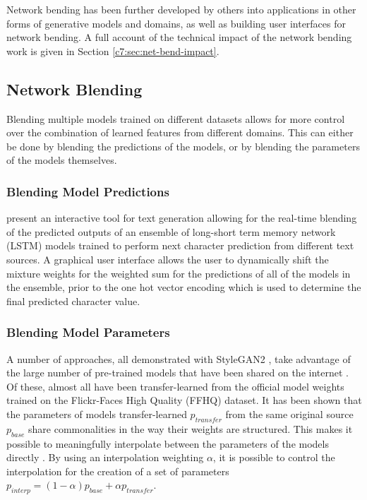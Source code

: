 Network bending has been further developed by others into applications in other forms of generative models and domains, as well as building user interfaces for network bending.
A full account of the technical impact of the network bending work is given in Section \ref{c7:sec:net-bend-impact}.

\subsection{Network Blending}
\label{survey:blending}

Blending multiple models trained on different datasets allows for more control over the combination of learned features from different domains. 
This can either be done by blending the predictions of the models, or by blending the parameters of the models themselves.

\subsubsection{Blending Model Predictions} 

\citet{akten2016real} present an interactive tool for text generation allowing for the real-time blending of the predicted outputs of an ensemble of long-short term memory network (LSTM) models \citep{hochreiter1997long} trained to perform next character prediction from different text sources. 
A graphical user interface allows the user to dynamically shift the mixture weights for the weighted sum for the predictions of all of the models in the ensemble, prior to the one hot vector encoding which is used to determine the final predicted character value.


\subsubsection{Blending Model Parameters} 
A number of approaches, all demonstrated with StyleGAN2 \citep{karras2019analyzing}, take advantage of the large number of pre-trained models that have been shared on the internet \citep{pinkney2020awesome}. 
Of these, almost all have been transfer-learned from the official model weights trained on the Flickr-Faces High Quality (FFHQ) dataset.
It has been shown that the parameters of models transfer-learned $p_{transfer}$ from the same original source $p_{base}$ share commonalities in the way their weights are structured. 
This makes it possible to meaningfully interpolate between the parameters of the models directly \citep{aydao2020interp}. 
By using an interpolation weighting $\alpha$, it is possible to control the interpolation for the creation of a set of parameters $p_{interp} = (1 - \alpha)p_{base} + \alpha p_{transfer}$. 

